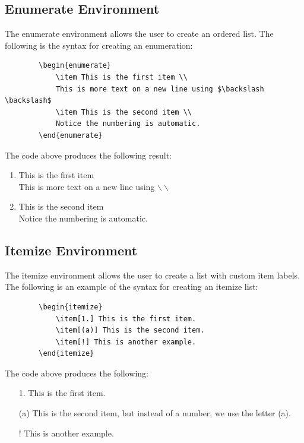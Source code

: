 \documentclass[]{article}
\begin{document}
    \subsection{Enumerate Environment}
    The enumerate environment allows the user to create an ordered list. The following is the syntax for creating an enumeration:
    \begin{verbatim}
        \begin{enumerate}
            \item This is the first item \\
            This is more text on a new line using $\backslash \backslash$
            \item This is the second item \\
            Notice the numbering is automatic.
        \end{enumerate}
    \end{verbatim}
    The code above produces the following result:
    \begin{enumerate}
        \item This is the first item \\
        This is more text on a new line using $\backslash \backslash$
        \item This is the second item \\
        Notice the numbering is automatic.
    \end{enumerate}
    \subsection{Itemize Environment}
    The itemize environment allows the user to create a list with custom item labels. The following is an example of the syntax for creating an itemize list:
    \begin{verbatim}
        \begin{itemize}
            \item[1.] This is the first item.
            \item[(a)] This is the second item.
            \item[!] This is another example.
        \end{itemize}
    \end{verbatim}
    The code above produces the following:
    \begin{itemize}
        \item[1.] This is the first item.
        \item[(a)] This is the second item, but instead of a number, we use the letter (a).
        \item[!] This is another example.
    \end{itemize}
\end{document}
